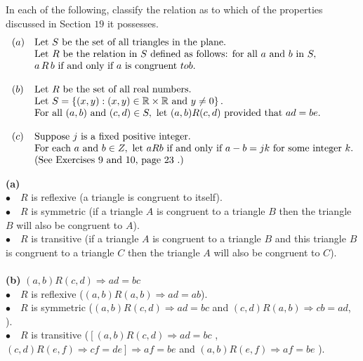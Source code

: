 \subsection{}
\begin{tcolorbox}
 In each of the following, classify the relation as to which of the properties discussed in Section $19$ it possesses.
  \begin{align*}
 \begin{array}{ll} 
(a)& \text{Let } S \text{ be the set of all triangles in the plane.} \\
& \text{Let } R \text{ be the relation in } S \text{ defined as follows: for all } a \text{ and } b \text{ in } S,\\
& a \, R \, b \text{ if and only if } a \text{ is congruent } to  b. \\\\
(b) &\text{Let } R \text{ be the set of all real numbers. }\\
&\text{Let } S = \left\{(x, y): (x, y) \in \mathbb{R}\times\mathbb{R} \text{ and }  y \neq 0\right\}.\\
&\text{For all } (a, b) \text{ and } (c, d) \in S, 
\text{ let } (a, b) R (c, d) \text{ provided that } ad = be. \\\\
(c)& \text{Suppose } j \text{ is a fixed positive integer.}\\
& \text{For each } a \text{ and } b\in Z, \text{ let } a R b \text{ if and only if } a - b = jk 
\text{ for some integer } k. \\
&\text{(See Exercises 9 and 10, page 23 .)  }
\end{array}
\end{align*} 
\end{tcolorbox}
$$ $$
\textbf{(a)}\\
$\bullet\quad R$ is reflexive (a triangle is congruent to itself).\\
$\bullet\quad R$ is symmetric (if a triangle $A$   is congruent to a triangle $B$ then the triangle $B$ will also be congruent to $A$).\\
$\bullet\quad R$ is transitive (if a triangle $A$   is congruent to a triangle $B$ and this triangle $B$ is congruent to a triangle $C$  then the triangle $A$ will also be congruent to $C$).\\\\


\textbf{(b)} $(a,b)R(c,d) \Rightarrow ad=bc$\\
$\bullet\quad R$ is reflexive ($(a,b)R(a,b) \Rightarrow ad=ab$).\\
$\bullet\quad R$ is symmetric ($(a,b)R(c,d) \Rightarrow ad=bc$ and  $(c,d)R(a,b) \Rightarrow cb=ad$, ).\\
$\bullet\quad R$ is transitive ($\left[(a,b)R(c,d) \Rightarrow ad=bc\right.$ ,   $\left.(c,d)R(e,f) \Rightarrow cf=de\right] \Rightarrow af=be$  and  $(a,b)R(e,f) \Rightarrow af=be$ ).\\\\

